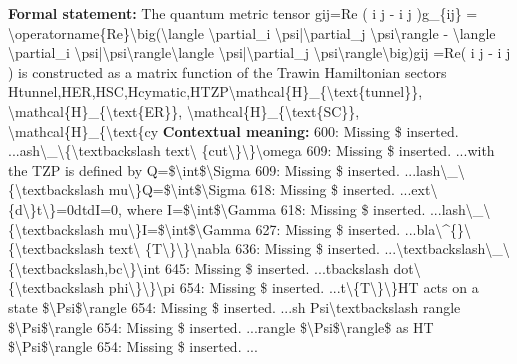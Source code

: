 \begingroup\footnotesize\setlength{\emergencystretch}{3em}\sloppy
\textbf{Formal statement:} The quantum metric tensor gij=Re (  i   j  -  i        j  )g\_\{ij\} = \textbackslash{}operatorname\{Re\}\textbackslash{}big(\textbackslash{}langle \textbackslash{}partial\_i \textbackslash{}psi|\textbackslash{}partial\_j \textbackslash{}psi\textbackslash{}rangle - \textbackslash{}langle \textbackslash{}partial\_i \textbackslash{}psi|\textbackslash{}psi\textbackslash{}rangle\textbackslash{}langle \textbackslash{}psi|\textbackslash{}partial\_j \textbackslash{}psi\textbackslash{}rangle\textbackslash{}big)gij =Re(  i    j   -  i         j   ) is constructed as a matrix function of the Trawin Hamiltonian sectors Htunnel,HER,HSC,Hcymatic,HTZP\textbackslash{}mathcal\{H\}\_\{\textbackslash{}text\{tunnel\}\}, \textbackslash{}mathcal\{H\}\_\{\textbackslash{}text\{ER\}\}, \textbackslash{}mathcal\{H\}\_\{\textbackslash{}text\{SC\}\}, \textbackslash{}mathcal\{H\}\_\{\textbackslash{}text\{cy
\textbf{Contextual meaning:} 600: Missing \$ inserted. ...ash\textbackslash{}\_\textbackslash{}\{\textbackslash{}textbackslash text\textbackslash{} \{cut\textbackslash{}\}\textbackslash{}\}\textbackslash{}omega 609: Missing \$ inserted. ...with the TZP is defined by Q=\$\textbackslash{}int\$\textbackslash{}Sigma 609: Missing \$ inserted. ...lash\textbackslash{}\_\textbackslash{}\{\textbackslash{}textbackslash mu\textbackslash{}\}Q=\$\textbackslash{}int\$\textbackslash{}Sigma 618: Missing \$ inserted. ...ext\textbackslash{}\{d\textbackslash{}\}t\textbackslash{}\}=0dtdI=0, where I=\$\textbackslash{}int\$\textbackslash{}Gamma 618: Missing \$ inserted. ...lash\textbackslash{}\_\textbackslash{}\{\textbackslash{}textbackslash mu\textbackslash{}\}I=\$\textbackslash{}int\$\textbackslash{}Gamma 627: Missing \$ inserted. ...bla\textbackslash{}\textasciicircum{}\{\}\textbackslash{}\{\textbackslash{}textbackslash text\textbackslash{} \{T\textbackslash{}\}\textbackslash{}\}\textbackslash{}nabla 636: Missing \$ inserted. ...\textbackslash{}textbackslash\textbackslash{}\_\textbackslash{} \{\textbackslash{}textbackslash,bc\textbackslash{}\}\textbackslash{}int 645: Missing \$ inserted. ...tbackslash dot\textbackslash{}\{\textbackslash{}textbackslash phi\textbackslash{}\}\textbackslash{}\}\textbackslash{}pi 654: Missing \$ inserted. ...t\textbackslash{}\{T\textbackslash{}\}\textbackslash{}\}HT acts on a state  \$\textbackslash{}Psi\$\textbackslash{}rangle 654: Missing \$ inserted. ...sh Psi\textbackslash{}textbackslash rangle \$\textbackslash{}Psi\$\textbackslash{}rangle 654: Missing \$ inserted. ...rangle \$\textbackslash{}Psi\$\textbackslash{}rangle\$ as HT \$\textbackslash{}Psi\$\textbackslash{}rangle 654: Missing \$ inserted. ...
